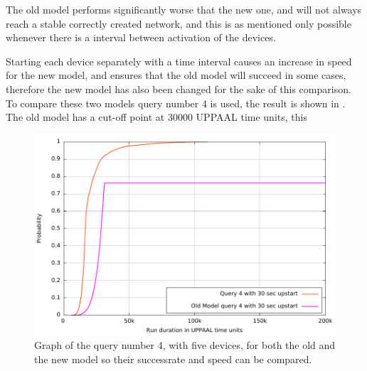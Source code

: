 The old model performs significantly worse that the new one, and will not always reach a stable correctly created network, and this is as mentioned only possible whenever there is a interval between activation of the devices.

Starting each device separately with a time interval causes an increase in speed for the new model, and ensures that the old model will succeed in some cases, therefore the new model has also been changed for the sake of this comparison. 
To compare these two models query number 4 is used, the result is shown in .
The old model has a cut-off point at $30 000$ UPPAAL time units, this

\begin{figure}[ht]
  \includegraphics[width=1\textwidth]{Figures/Graphs/gnuplot/uppaal_Compare/graph.pdf} 
\caption{Graph of the query number 4, with five devices, for both the old and the new model so their successrate and speed can be compared.}
\label{CompareGraph}
\end{figure}

